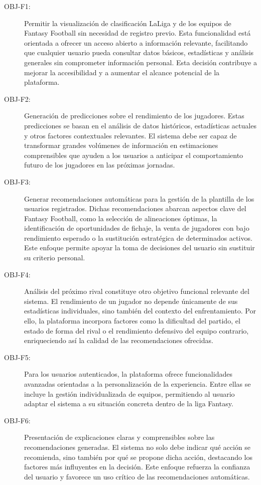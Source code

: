 \begin{description}
\item[OBJ-F1:] Permitir la visualización de clasificación LaLiga y de los equipos de Fantasy 
Football sin necesidad de registro previo. Esta funcionalidad está orientada a ofrecer un 
acceso abierto a información relevante, facilitando que cualquier usuario pueda consultar 
datos básicos, estadísticas y análisis generales sin comprometer información personal. Esta 
decisión contribuye a mejorar la accesibilidad y a aumentar el alcance potencial de la 
plataforma.

\item[OBJ-F2:] Generación de predicciones sobre el rendimiento de los jugadores. Estas predicciones 
se basan en el análisis de datos históricos, estadísticas actuales y otros factores 
contextuales relevantes. El sistema debe ser capaz de transformar grandes volúmenes de 
información en estimaciones comprensibles que ayuden a los usuarios a anticipar el 
comportamiento futuro de los jugadores en las próximas jornadas.

\item[OBJ-F3:] Generar recomendaciones automáticas para la gestión de la plantilla de los usuarios 
registrados. Dichas recomendaciones abarcan aspectos clave del Fantasy Football, como la 
selección de alineaciones óptimas, la identificación de oportunidades de fichaje, la venta 
de jugadores con bajo rendimiento esperado o la sustitución estratégica de determinados 
activos. Este enfoque permite apoyar la toma de decisiones del usuario sin sustituir su 
criterio personal.

\item[OBJ-F4:] Análisis del próximo rival constituye otro objetivo funcional relevante del sistema. 
El rendimiento de un jugador no depende únicamente de sus estadísticas individuales, sino 
también del contexto del enfrentamiento. Por ello, la plataforma incorpora factores como la 
dificultad del partido, el estado de forma del rival o el rendimiento defensivo del equipo 
contrario, enriqueciendo así la calidad de las recomendaciones ofrecidas.

\item[OBJ-F5:] Para los usuarios autenticados, la plataforma ofrece funcionalidades avanzadas 
orientadas a la personalización de la experiencia. Entre ellas se incluye la gestión 
individualizada de equipos, permitiendo al usuario adaptar el sistema a su situación concreta 
dentro de la liga Fantasy.

\item[OBJ-F6:] Presentación de explicaciones claras y comprensibles sobre las recomendaciones 
generadas. El sistema no solo debe indicar qué acción se recomienda, sino también por qué se 
propone dicha acción, destacando los factores más influyentes en la decisión. Este enfoque 
refuerza la confianza del usuario y favorece un uso crítico de las recomendaciones 
automáticas.


\end{description}
